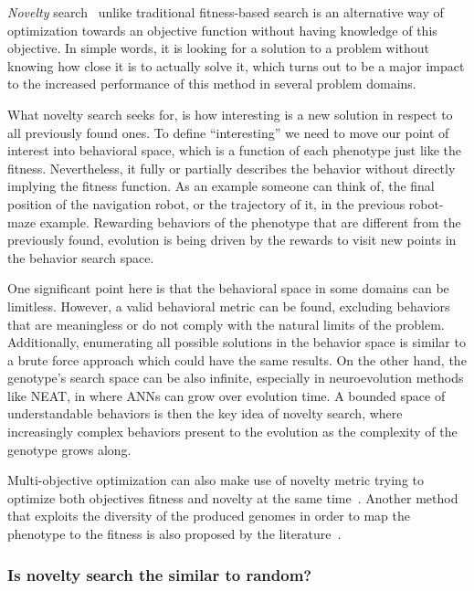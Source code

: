 \emph{Novelty} search~\citep{lehman2008exploiting,lehman2011abandoning,lehman2010revising, risi2009novelty} unlike traditional fitness-based search is an alternative way of optimization towards an objective function without having knowledge of this objective. In simple words, it is looking for a solution to a problem without knowing how close it is to actually solve it, which turns out to be a major impact to the increased performance of this method in several problem domains. 

What novelty search seeks for, is how interesting is a new solution in respect to all previously found ones. To define ``interesting'' we need to move our point of interest into behavioral space, which is a function of each phenotype just like the fitness. Nevertheless, it fully or partially describes the behavior without directly implying the fitness function. As an example someone can think of, the final position of the navigation robot, or the trajectory of it, in the previous robot-maze example. Rewarding behaviors of the phenotype that are different from the previously found, evolution is being driven by the rewards to visit new points in the behavior search space.

One significant point here is that the behavioral space in some domains can be limitless. However, a valid behavioral metric can be found, excluding behaviors that are meaningless or do not comply with the natural limits of the problem. Additionally, enumerating all possible solutions in the behavior space is similar to a brute force approach which could have the same results. On the other hand, the genotype's search space can be also infinite, especially in neuroevolution methods like NEAT, in where ANNs can grow over evolution time. A bounded space of understandable behaviors is then the key idea of novelty search, where increasingly complex behaviors present to the evolution as the complexity of the genotype grows along.

Multi-objective optimization can also make use of novelty metric trying to optimize both objectives fitness and novelty at the same time~\citep{mouret2011novelty}. Another method that exploits the diversity of the produced genomes in order to map the phenotype to the fitness is also proposed by the literature~\citep{mouret2012algorithm}.

\subsubsection*{Is novelty search the similar to random?}


